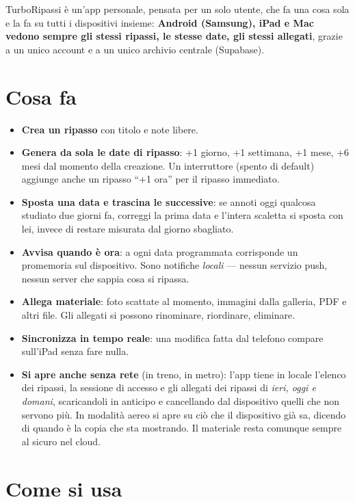 \documentclass[11pt,a4paper]{report}
\begin{document}
TurboRipassi è un'app personale, pensata per un solo utente, che fa una cosa sola e
la fa su tutti i dispositivi insieme: \textbf{Android (Samsung), iPad e Mac
vedono sempre gli stessi ripassi, le stesse date, gli stessi allegati}, grazie
a un unico account e a un unico archivio centrale (Supabase).

\section{Cosa fa}

\begin{itemize}[nosep]
  \item \textbf{Crea un ripasso} con titolo e note libere.
  \item \textbf{Genera da sola le date di ripasso}: +1 giorno, +1 settimana,
        +1 mese, +6 mesi dal momento della creazione. Un interruttore
        (spento di default) aggiunge anche un ripasso ``+1 ora'' per il
        ripasso immediato.
  \item \textbf{Sposta una data e trascina le successive}: se annoti oggi
        qualcosa studiato due giorni fa, correggi la prima data e l'intera
        scaletta si sposta con lei, invece di restare misurata dal giorno
        sbagliato.
  \item \textbf{Avvisa quando \`e ora}: a ogni data programmata corrisponde un
        promemoria sul dispositivo. Sono notifiche \emph{locali} --- nessun
        servizio push, nessun server che sappia cosa si ripassa.
  \item \textbf{Allega materiale}: foto scattate al momento, immagini dalla
        galleria, PDF e altri file. Gli allegati si possono rinominare,
        riordinare, eliminare.
  \item \textbf{Sincronizza in tempo reale}: una modifica fatta dal telefono
        compare sull'iPad senza fare nulla.
  \item \textbf{Si apre anche senza rete} (in treno, in metro): l'app tiene in
        locale l'elenco dei ripassi, la sessione di accesso e gli allegati dei
        ripassi di \emph{ieri, oggi e domani}, scaricandoli in anticipo e
        cancellando dal dispositivo quelli che non servono pi\`u. In modalit\`a
        aereo si apre su ci\`o che il dispositivo gi\`a sa, dicendo di quando
        \`e la copia che sta mostrando. Il materiale resta comunque sempre al
        sicuro nel cloud.
\end{itemize}

\section{Come si usa}
\end{document}
